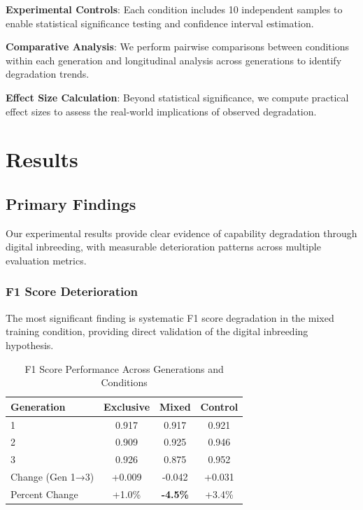 \documentclass{article}
\begin{document}
\textbf{Experimental Controls}: Each condition includes 10 independent samples to enable statistical significance testing and confidence interval estimation.

\textbf{Comparative Analysis}: We perform pairwise comparisons between conditions within each generation and longitudinal analysis across generations to identify degradation trends.

\textbf{Effect Size Calculation}: Beyond statistical significance, we compute practical effect sizes to assess the real-world implications of observed degradation.

\section{Results}

\subsection{Primary Findings}

Our experimental results provide clear evidence of capability degradation through digital inbreeding, with measurable deterioration patterns across multiple evaluation metrics.

\subsubsection{F1 Score Deterioration}

The most significant finding is systematic F1 score degradation in the mixed training condition, providing direct validation of the digital inbreeding hypothesis.

\begin{table}[h]
\centering
\caption{F1 Score Performance Across Generations and Conditions}
\label{tab:f1_results}
\begin{tabular}{@{}lccc@{}}
\toprule
Generation & Exclusive & Mixed & Control \\
\midrule
1 & 0.917 & 0.917 & 0.921 \\
2 & 0.909 & 0.925 & 0.946 \\
3 & 0.926 & 0.875 & 0.952 \\
\midrule
Change (Gen 1→3) & +0.009 & -0.042 & +0.031 \\
Percent Change & +1.0\% & \textbf{-4.5\%} & +3.4\% \\
\bottomrule
\end{tabular}
\end{table}
\end{document}
